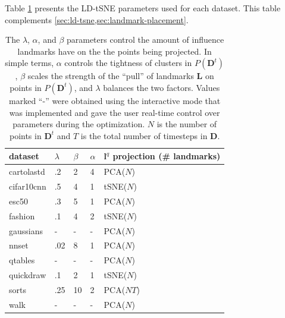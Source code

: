Table \ref{tab:ld-params} presents the LD-tSNE parameters used for each dataset. This table complements \cref{sec:ld-tsne,sec:landmark-placement}. 

\begin{table}[ht!]
  \centering
  \selectfont
  \scriptsize
  \begin{tabular}{|l|l|l|l|l|}
    \hline
  dataset    & $\lambda$ & $\beta$ & $\alpha$ & $\mathbf{l}^q$ projection (\# landmarks) \\ \hline
  \hline
  cartolastd & .2     & 2  & 4  & PCA($N$)                 \\ \hline
  cifar10cnn & .5     & 4  & 1  & tSNE($N$)               \\ \hline
  esc50      & .3     & 5  & 1  & PCA($N$)                 \\ \hline
  fashion    & .1     & 4  & 2  & tSNE($N$)               \\ \hline
  gaussians  & -      & -  & -  & PCA($N$)                 \\ \hline
  nnset      & .02    & 8  & 1  & PCA($N$)                 \\ \hline
  qtables    & -      & -  & -  & PCA($N$)                 \\ \hline
  quickdraw  & .1     & 2  & 1  & tSNE($N$)               \\ \hline
  sorts      & .25    & 10 & 2  & PCA($NT$)               \\ \hline
  walk       & -      & -  & -  & PCA($N$)                 \\ \hline
  \end{tabular}
  \caption{The $\lambda$, $\alpha$, and $\beta$ parameters control the amount of influence landmarks have on the the points being projected. In simple terms, $\alpha$ controls the tightness of clusters in $P(\mathbf{D}^t)$, $\beta$ scales the strength of the ``pull'' of landmarks $\mathbf{L}$ on points in $P(\mathbf{D}^t)$, and $\lambda$ balances the two factors. 
  Values marked ``-'' were obtained using the interactive mode that was implemented and gave the user real-time control over parameters during the optimization. $N$ is the number of points in $\mathbf{D}^t$ and $T$ is the total number of timesteps in $\mathbf{D}$.}
  \label{tab:ld-params}
\end{table}


